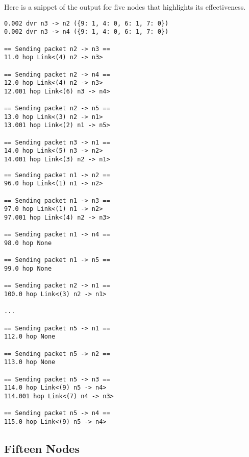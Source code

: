 \documentclass[fleqn,11pt]{article}
\begin{document}
Here is a snippet of the output for five nodes that highlights its effectiveness.
\begin{verbatim}
0.002 dvr n3 -> n2 ({9: 1, 4: 0, 6: 1, 7: 0})
0.002 dvr n3 -> n4 ({9: 1, 4: 0, 6: 1, 7: 0})
                                     
== Sending packet n2 -> n3 ==
11.0 hop Link<(4) n2 -> n3>
                                        
== Sending packet n2 -> n4 ==
12.0 hop Link<(4) n2 -> n3>
12.001 hop Link<(6) n3 -> n4>
                                        
== Sending packet n2 -> n5 ==
13.0 hop Link<(3) n2 -> n1>
13.001 hop Link<(2) n1 -> n5>
                                        
== Sending packet n3 -> n1 ==
14.0 hop Link<(5) n3 -> n2>
14.001 hop Link<(3) n2 -> n1>
\end{verbatim}

\begin{verbatim}    
== Sending packet n1 -> n2 ==
96.0 hop Link<(1) n1 -> n2>
                                        
== Sending packet n1 -> n3 ==
97.0 hop Link<(1) n1 -> n2>
97.001 hop Link<(4) n2 -> n3>
                                        
== Sending packet n1 -> n4 ==
98.0 hop None
                                        
== Sending packet n1 -> n5 ==
99.0 hop None
                                        
== Sending packet n2 -> n1 ==
100.0 hop Link<(3) n2 -> n1>
                                        
...
    
== Sending packet n5 -> n1 ==
112.0 hop None
                                        
== Sending packet n5 -> n2 ==
113.0 hop None
                                        
== Sending packet n5 -> n3 ==
114.0 hop Link<(9) n5 -> n4>
114.001 hop Link<(7) n4 -> n3>
                                        
== Sending packet n5 -> n4 ==
115.0 hop Link<(9) n5 -> n4>
\end{verbatim}

\subsection{Fifteen Nodes}
\end{document}
